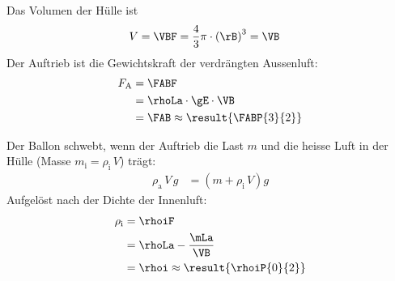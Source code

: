 \begin{center}
\end{center}

\begin{abcliste}
\abc Das Volumen der Hülle ist
\begin{align}
 V &= \VBF = \frac{4}{3}\pi\cdot\left(\rB\right)^3 = \VB
\end{align}
Der Auftrieb ist die Gewichtskraft der verdrängten Aussenluft:
\begin{align}
 F_\text{A} &= \FABF \\
   &= \rhoLa\cdot\gE\cdot\VB \\
   &= \FAB \approx \result{\FABP{3}{2}}
\end{align}

\abc Der Ballon schwebt, wenn der Auftrieb die Last $m$ und die heisse Luft in der Hülle (Masse $m_\text{i} = \rho_\text{i}\,V$) trägt:
\begin{align}
 \rho_\text{a}\,V\,g &= \left(m + \rho_\text{i}\,V\right)g
\end{align}
Aufgelöst nach der Dichte der Innenluft:
\begin{align}
 \rho_\text{i} &= \rhoiF \\
   &= \rhoLa - \frac{\mLa}{\VB} \\
   &= \rhoi \approx \result{\rhoiP{0}{2}}
\end{align}
\end{abcliste}
